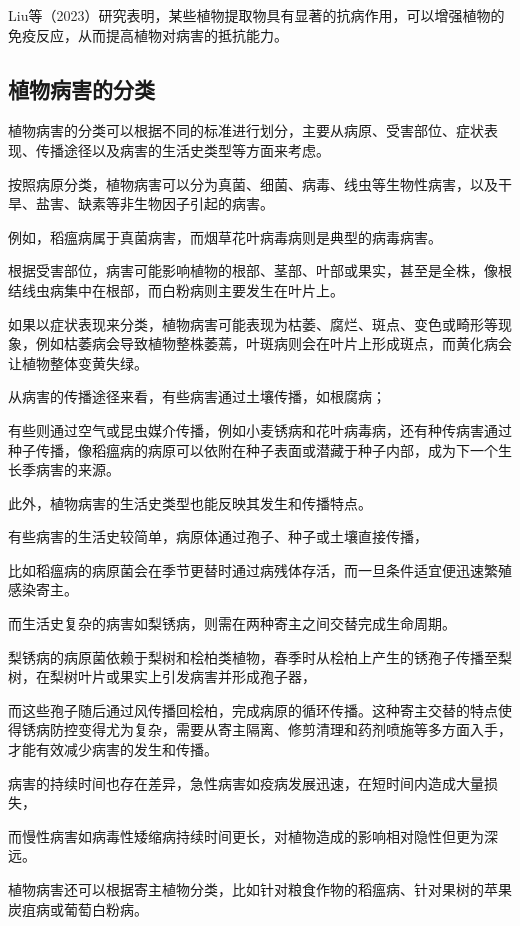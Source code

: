 \documentclass[AutoFakeBold]{LZUThesis-PgD&PhD}
\begin{document}
Liu等（2023）研究表明，某些植物提取物具有显著的抗病作用，可以增强植物的免疫反应，从而提高植物对病害的抵抗能力\cite{liu2023natural}。


\subsection{植物病害的分类}

植物病害的分类可以根据不同的标准进行划分，主要从病原、受害部位、症状表现、传播途径以及病害的生活史类型等方面来考虑。


按照病原分类，植物病害可以分为真菌、细菌、病毒、线虫等生物性病害，以及干旱、盐害、缺素等非生物因子引起的病害。


例如，稻瘟病属于真菌病害，而烟草花叶病毒病则是典型的病毒病害。


根据受害部位，病害可能影响植物的根部、茎部、叶部或果实，甚至是全株，像根结线虫病集中在根部，而白粉病则主要发生在叶片上。


如果以症状表现来分类，植物病害可能表现为枯萎、腐烂、斑点、变色或畸形等现象，例如枯萎病会导致植物整株萎蔫，叶斑病则会在叶片上形成斑点，而黄化病会让植物整体变黄失绿。


从病害的传播途径来看，有些病害通过土壤传播，如根腐病；

有些则通过空气或昆虫媒介传播，例如小麦锈病和花叶病毒病，还有种传病害通过种子传播，像稻瘟病的病原可以依附在种子表面或潜藏于种子内部，成为下一个生长季病害的来源。

此外，植物病害的生活史类型也能反映其发生和传播特点。

有些病害的生活史较简单，病原体通过孢子、种子或土壤直接传播，

比如稻瘟病的病原菌会在季节更替时通过病残体存活，而一旦条件适宜便迅速繁殖感染寄主。


而生活史复杂的病害如梨锈病，则需在两种寄主之间交替完成生命周期。

梨锈病的病原菌依赖于梨树和桧柏类植物，春季时从桧柏上产生的锈孢子传播至梨树，在梨树叶片或果实上引发病害并形成孢子器，


而这些孢子随后通过风传播回桧柏，完成病原的循环传播。这种寄主交替的特点使得锈病防控变得尤为复杂，需要从寄主隔离、修剪清理和药剂喷施等多方面入手，才能有效减少病害的发生和传播。


病害的持续时间也存在差异，急性病害如疫病发展迅速，在短时间内造成大量损失，


而慢性病害如病毒性矮缩病持续时间更长，对植物造成的影响相对隐性但更为深远。

植物病害还可以根据寄主植物分类，比如针对粮食作物的稻瘟病、针对果树的苹果炭疽病或葡萄白粉病。
\end{document}
